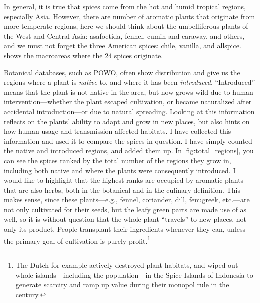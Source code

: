 In general, it is true that spices come from the hot and humid tropical regions, especially Asia. However, there are number of aromatic plants that originate from more temperate regions, here we should think about the umbelliferous plants of the West and Central Asia: asafoetida, fennel, cumin and caraway, and others, and we must not forget the three American spices: chile, vanilla, and allspice.  shows the macroareas where the 24 spices originate.

Botanical databases, such as \gls{POWO}, often show distribution and  give us the regions where a plant is \textit{native} to, and where it has been \textit{introduced}. ``Introduced'' means that the plant is not native in the area, but now grows wild due to human intervention---whether the plant escaped cultivation, or became naturalized after accidental introduction---or due to natural spreading. Looking at this information reflects on the plants' ability to adapt and grow in new places, but also hints on how human usage and transmission affected habitats. I have collected this information and used it to compare the spices in question. I have simply counted the native and introduced regions, and added them up. In \cref{fig:total_regions}, you can see the spices ranked by the total number of the regions they grow in, including both native and where the plants were consequently introduced. I would like to highlight that the highest ranks are occupied by aromatic plants that are also herbs, both in the botanical and in the culinary definition. This makes sense, since these plants---e.g., fennel, coriander, dill, fenugreek, etc.---are not only cultivated for their seeds, but the leafy green parts are made use of as well, so it is without question that the whole plant ``travels'' to new places, not only its product. People transplant their ingredients whenever they can, unless the primary goal of cultivation is purely profit.\footnote{The Dutch for example actively destroyed plant habitats, and wiped out whole islands---including the population---in the Spice Islands of Indonesia to generate scarcity and ramp up value during their monopol rule in the  century.}

